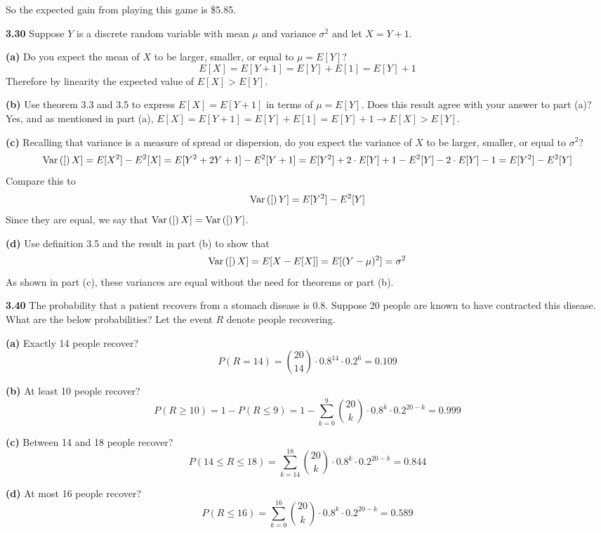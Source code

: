 \documentclass{exam}
\begin{document}
\begin{questions}
So the expected gain from playing this game is \$5.85.



\newpage
\textbf{3.30 }
Suppose $Y$ is a discrete random variable with mean $\mu$ and variance $\sigma^2$ and let $X = Y + 1$.

\newline

\textbf{(a) } Do you expect the mean of $X$ to be larger, smaller, or equal to $\mu = E[Y]$?
\sol
$$E[X] = E[Y + 1] = E[Y] + E[1] = E[Y] + 1$$
Therefore by linearity the expected value of $E[X] > E[Y]$.

\textbf{(b) } Use theorem 3.3 and 3.5 to express $E[X] = E[Y + 1]$ in terms of $\mu = E[Y]$. Does this result agree with your answer to part (a)?
\sol
Yes, and as mentioned in part (a), $E[X] = E[Y + 1] = E[Y] + E[1] = E[Y] + 1 \rightarrow E[X] > E[Y]$.


\textbf{(c) } Recalling that variance is a measure of spread or dispersion, do you expect the variance of $X$ to be larger, smaller, or equal to $\sigma^2$?
\sol
$$\text{Var}\left( [ \right)X] = E[X^2] - E^2[X] = E[Y^2 + 2Y + 1] - E^2[Y + 1] = E[Y^2] + 2 \cdot E[Y] + 1 - E^2[Y] - 2 \cdot E[Y] - 1 = E[Y^2] - E^2[Y]$$
Compare this to
$$\text{Var}\left( [ \right)Y] = E[Y^2] - E^2[Y]$$
Since they are equal, we say that $\text{Var}\left( [ \right)X] = \text{Var}\left( [ \right)Y]$.


\textbf{(d) } Use definition 3.5 and the result in part (b) to show that
$$\text{Var}\left( [ \right)X] = E[X - E[X]] = E[(Y - \mu)^2] = \sigma^2$$
\sol
As shown in part (c), these variances are equal without the need for theorems or part (b).


\newpage
\textbf{3.40 } The probability that a patient recovers from a stomach disease is 0.8. Suppose 20 people are known to have contracted this disease. What are the below probabilities? Let the event $R$ denote people recovering.


\textbf{(a) } Exactly 14 people recover?
\sol
$$P(R = 14) = \binom{20}{14} \cdot 0.8^{14} \cdot 0.2^6 = 0.109$$

\textbf{(b) } At least 10 people recover?
\sol
$$P(R \geq 10) = 1 - P(R \leq 9) = 1 - \sum_{k = 0}^9 \binom{20}{k} \cdot 0.8^k \cdot 0.2^{20 - k} = 0.999$$


\textbf{(c) } Between 14 and 18 people recover?
\sol
$$P(14 \leq R \leq 18) = \sum_{k = 14}^{18} \binom{20}{k} \cdot 0.8^k \cdot 0.2^{20 - k} = 0.844$$


\textbf{(d) } At most 16 people recover?
\sol
$$P(R \leq 16) = \sum_{k = 0}^{16} \binom{20}{k} \cdot 0.8^k \cdot 0.2^{20 - k} = 0.589$$



\end{questions}
\end{document}
